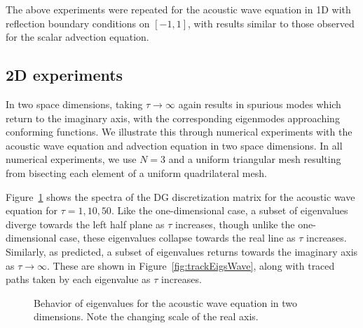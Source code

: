 \documentclass[preprint,10pt]{elsarticle}
\begin{document}
The above experiments were repeated for the acoustic wave equation in 1D with reflection boundary conditions on $[-1,1]$, with results similar to those observed for the scalar advection equation.   %


\subsection{2D experiments}

In two space dimensions, taking $\tau\rightarrow \infty$ again results in spurious modes which return to the imaginary axis, with the corresponding eigenmodes approaching conforming functions.  We illustrate this through numerical experiments with the acoustic wave equation and advection equation in two space dimensions.  In all numerical experiments, we use $N=3$ and a uniform triangular mesh resulting from bisecting each element of a uniform quadrilateral mesh.  

Figure~\ref{fig:waveeigs} shows the spectra of the DG discretization matrix for the acoustic wave equation for $\tau = 1, 10, 50$.  Like the one-dimensional case, a subset of eigenvalues diverge towards the left half plane as $\tau$ increases, though unlike the one-dimensional case, these eigenvalues collapse towards the real line as $\tau$ increases.  Similarly, as predicted, a subset of eigenvalues returns towards the imaginary axis as $\tau \rightarrow \infty$.  These are shown in Figure~\ref{fig:trackEigsWave}, along with traced paths taken by each eigenvalue as $\tau$ increases.  

\begin{figure}
\centering
{}
\hspace{.5em}
\hspace{.5em}
\caption{Behavior of eigenvalues for the acoustic wave equation in two dimensions. Note the changing scale of the real axis.}
\label{fig:waveeigs}
\end{figure}
\end{document}
